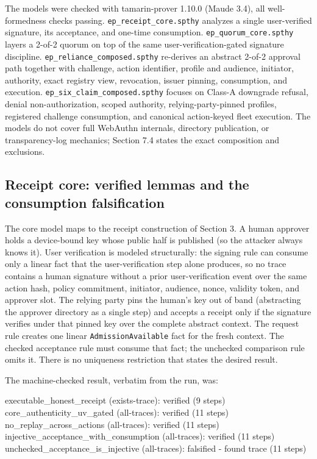 \documentclass[11pt]{article}
\newcommand{\code}[1]{\texttt{#1}}
\begin{document}
The models were checked with tamarin-prover 1.10.0 (Maude 3.4), all
well-formedness checks passing. \code{ep\_receipt\_core.spthy} analyzes a single
user-verified signature, its acceptance, and one-time consumption.
\code{ep\_quorum\_core.spthy} layers a 2-of-2 quorum on top of the same
user-verification-gated signature discipline. \code{ep\_reliance\_composed.spthy}
re-derives an abstract 2-of-2 approval path together with challenge, action
identifier, profile and audience, initiator, authority, exact registry view,
revocation, issuer pinning, consumption, and execution.
\code{ep\_six\_claim\_composed.spthy} focuses on Class-A downgrade refusal,
denial non-authorization, scoped authority, relying-party-pinned profiles,
registered challenge consumption, and canonical action-keyed fleet execution.
The models do not cover full WebAuthn internals, directory publication, or
transparency-log mechanics; Section 7.4 states the exact composition and
exclusions.

\subsection{Receipt core: verified lemmas and the consumption falsification}

The core model maps to the receipt construction of Section 3. A human approver
holds a device-bound key whose public half is published (so the attacker always
knows it). User verification is modeled structurally: the signing rule can consume
only a linear fact that the user-verification step alone produces, so no trace
contains a human signature without a prior user-verification event over the same
action hash, policy commitment, initiator, audience, nonce, validity token, and
approver slot. The relying party pins the human's key out of band (abstracting
the approver directory as a single step) and accepts a receipt only if the
signature verifies under that pinned key over the complete abstract context.
The request rule creates one linear \code{AdmissionAvailable} fact for the fresh
context. The checked acceptance rule must consume that fact; the unchecked
comparison rule omits it. There is no uniqueness restriction that states the
desired result.

The machine-checked result, verbatim from the run, was:

\begin{tool}
executable_honest_receipt (exists-trace): verified (9 steps)
core_authenticity_uv_gated (all-traces): verified (11 steps)
no_replay_across_actions (all-traces): verified (11 steps)
injective_acceptance_with_consumption (all-traces): verified (11 steps)
unchecked_acceptance_is_injective (all-traces): falsified - found trace (11 steps)
\end{tool}
\end{document}
